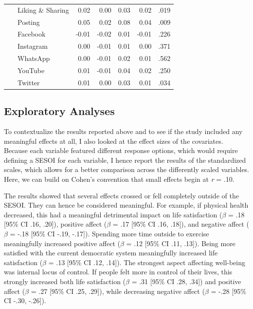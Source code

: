 \documentclass[
  man,mask,floatsintext]{apa7}
\begin{document}
\begin{table}[tbp]
\begin{center}
\begin{threeparttable}
{\begin{tabular}{lrrrrr}
\ \ \ Liking \& Sharing & 0.02 & 0.00 & 0.03 & 0.02 & .019\\
\ \ \ Posting & 0.05 & 0.02 & 0.08 & 0.04 & .009\\
\ \ \ Facebook & -0.01 & -0.02 & 0.01 & -0.01 & .226\\
\ \ \ Instagram & 0.00 & -0.01 & 0.01 & 0.00 & .371\\
\ \ \ WhatsApp & 0.00 & -0.01 & 0.02 & 0.01 & .562\\
\ \ \ YouTube & 0.01 & -0.01 & 0.04 & 0.02 & .250\\
\ \ \ Twitter & 0.01 & 0.00 & 0.03 & 0.01 & .034\\
\bottomrule
\end{tabular}

}

\end{threeparttable}
\end{center}

\end{table}

\hypertarget{exploratory-analyses}{%
\subsection{Exploratory Analyses}\label{exploratory-analyses}}

To contextualize the results reported above and to see if the study included any meaningful effects at all, I also looked at the effect sizes of the covariates.
Because each variable featured different response options, which would require defining a SESOI for each variable, I hence report the results of the standardized scales, which allows for a better comparison across the differently scaled variables.
Here, we can build on Cohen's convention that small effects begin at \emph{r} = \textbar.10\textbar.

The results showed that several effects crossed or fell completely outside of the SESOI.
They can hence be considered meaningful.
For example, if physical health decreased, this had a meaningful detrimental impact on life satisfaction (\(\beta\) = .18 {[}95\% CI .16, .20{]}), positive affect (\(\beta\) = .17 {[}95\% CI .16, .18{]}), and negative affect (\(\beta\) = -.18 {[}95\% CI -.19, -.17{]}).
Spending more time outside to exercise meaningfully increased positive affect (\(\beta\) = .12 {[}95\% CI .11, .13{]}).
Being more satisfied with the current democratic system meaningfully increased life satisfaction (\(\beta\) = .13 {[}95\% CI .12, .14{]}).
The strongest aspect affecting well-being was internal locus of control.
If people felt more in control of their lives, this strongly increased both life satisfaction (\(\beta\) = .31 {[}95\% CI .28, .34{]}) and
positive affect (\(\beta\) = .27 {[}95\% CI .25, .29{]}),
while decreasing negative affect (\(\beta\) = -.28 {[}95\% CI -.30, -.26{]}).
\end{document}
